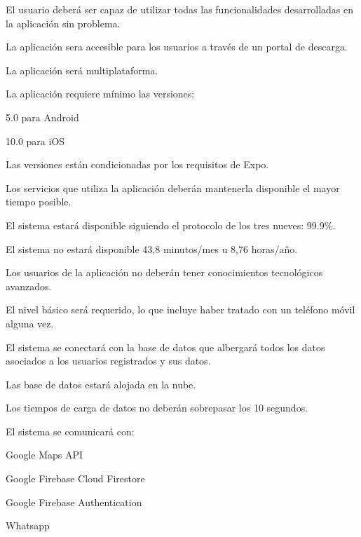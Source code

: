 
\begin{myEnumNF}
	\item El usuario deberá ser capaz de utilizar todas las funcionalidades desarrolladas en la aplicación sin problema.
	\item La aplicación sera accesible para los usuarios a través de un portal de descarga.
	\begin{myEnumNF}
		\item La aplicación será multiplataforma.
		\begin{myEnumNF}
			\item La aplicación requiere mínimo las versiones:
			\begin{myEnumNF}
				\item 5.0 para Android
				\item 10.0 para iOS
			\end{myEnumNF}
			\item Las versiones están condicionadas por los requisitos de Expo.
		\end{myEnumNF}
	\end{myEnumNF}
	
	\item Los servicios que utiliza la aplicación deberán mantenerla disponible el mayor tiempo posible.
	\begin{myEnumNF}
		\item El sistema estará disponible siguiendo el protocolo de los tres nueves: 99.9\%.
		\begin{myEnumNF}
			\item El sistema no estará disponible 43,8 minutos/mes u 8,76 horas/año.
		\end{myEnumNF}
	\end{myEnumNF}
	\item Los usuarios de la aplicación no deberán tener conocimientos tecnológicos avanzados.
		\begin{myEnumNF}
		\item El nivel básico será requerido, lo que incluye haber tratado con un teléfono móvil alguna vez.
	\end{myEnumNF}
	
	\item El sistema se conectará con la base de datos que albergará todos los datos asociados a los usuarios registrados y sus datos.
	\begin{myEnumNF}
		\item Las base de datos estará alojada en la nube.
		\item Los tiempos de carga de datos no deberán sobrepasar los 10 segundos.
	\end{myEnumNF}

	\item El sistema se comunicará con:
	\begin{myEnumNF}
		\item Google Maps API
		\item Google Firebase Cloud Firestore
		\item Google Firebase Authentication
		\item Whatsapp
	\end{myEnumNF}
\end{myEnumNF}